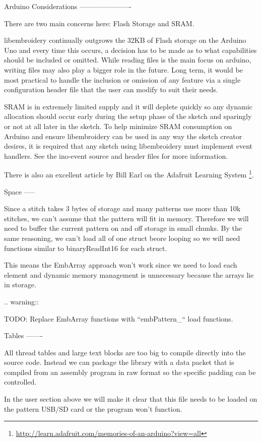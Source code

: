 \documentclass[a4paper]{report}
\begin{document}
{{{{{Arduino Considerations
----------------------

There are two main concerns here: Flash Storage and SRAM.

libembroidery continually outgrows the 32KB of Flash storage on the
Arduino Uno and every time this occurs, a decision has to be made as to
what capabilities should be included or omitted. While reading files is
the main focus on arduino, writing files may also play a bigger role
in the future. Long term, it would be most practical to handle the
inclusion or omission of any feature via a single configuration header
file that the user can modify to suit their needs.

SRAM is in extremely limited supply and it will deplete quickly so any
dynamic allocation should occur early during the setup phase of the
sketch and sparingly or not at all later in the sketch. To help minimize
SRAM consumption on Arduino and ensure libembroidery can be used in any
way the sketch creator desires, it is required that any sketch using
libembroidery must implement event handlers. See the ino-event source
and header files for more information.

There is also an excellent article by Bill Earl on the Adafruit Learning
System
\footnote{\url{http://learn.adafruit.com/memories-of-an-arduino?view=all}}.

Space
-----

Since a stitch takes 3 bytes of storage and many patterns use more than
10k stitches, we can't assume that the pattern will fit in memory. Therefore
we will need to buffer the current pattern on and off storage in small
chunks. By the same reasoning, we can't load all of one struct beore
looping so we will need functions similar to binaryReadInt16 for each
struct.

This means the EmbArray approach won't work since we need to load
each element and dynamic memory management is unnecessary because
the arrays lie in storage.

.. warning::

   TODO: Replace EmbArray functions with ``embPattern_`` load functions.

Tables
-------

All thread tables and large text blocks are too big to compile directly
into the source code. Instead we can package the library with a data packet
that is compiled from an assembly program in raw format so the specific
padding can be controlled.

In the user section above we will make it clear that this file
needs to be loaded on the pattern USB/SD card or the program won't function.

}}}}}
\end{document}
